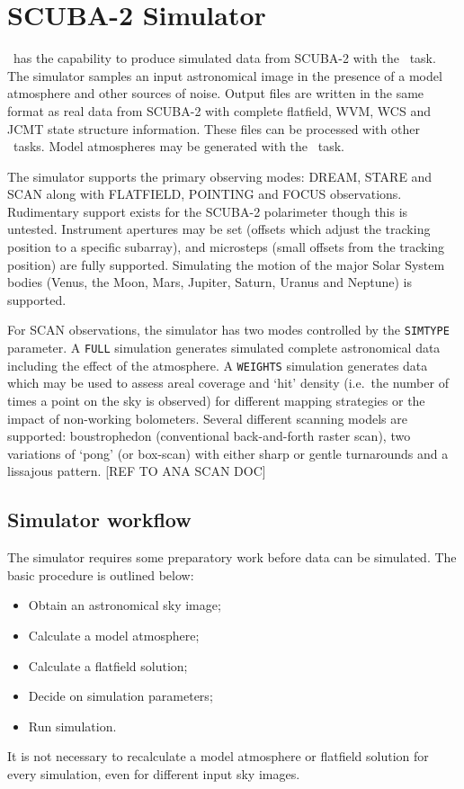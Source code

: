 \documentclass[oneside,11pt]{starlink}
\begin{document}
\section{SCUBA-2 Simulator\label{se:sc2sim}}

\SMURF\ has the capability to produce simulated data from SCUBA-2 with
the \sctwosim\ task. The simulator samples an input astronomical image
in the presence of a model atmosphere and other sources of noise.
Output files are written in the same format as real data from SCUBA-2
with complete flatfield, WVM, WCS and JCMT state structure
information. These files can be processed with other \SMURF\
tasks. Model atmospheres may be generated with the \skynoise\ task.

The simulator supports the primary observing modes: DREAM, STARE and
SCAN along with FLATFIELD, POINTING and FOCUS
observations. Rudimentary support exists for the SCUBA-2 polarimeter
though this is untested. Instrument apertures may be set (offsets
which adjust the tracking position to a specific subarray), and
microsteps (small offsets from the tracking position) are fully
supported. Simulating the motion of the major Solar System bodies
(Venus, the Moon, Mars, Jupiter, Saturn, Uranus and Neptune) is
supported.

For SCAN observations, the simulator has two modes controlled by the
\texttt{SIMTYPE} parameter. A \texttt{FULL} simulation generates
simulated complete astronomical data including the effect of the
atmosphere. A \texttt{WEIGHTS} simulation generates data which may be
used to assess areal coverage and `hit' density (i.e.\ the number of
times a point on the sky is observed) for different mapping strategies
or the impact of non-working bolometers. Several different scanning
models are supported: boustrophedon (conventional back-and-forth
raster scan), two variations of `pong' (or box-scan) with either
sharp or gentle turnarounds and a lissajous pattern. [REF TO ANA SCAN DOC]

\subsection{Simulator workflow\label{se:simuse}}

The simulator requires some preparatory work before data can be
simulated. The basic procedure is outlined below:
\begin{itemize}
\item Obtain an astronomical sky image;
\item Calculate a model atmosphere;
\item Calculate a flatfield solution;
\item Decide on simulation parameters;
\item Run simulation.
\end{itemize}
It is not necessary to recalculate a model atmosphere or flatfield
solution for every simulation, even for different input sky images.
\end{document}

